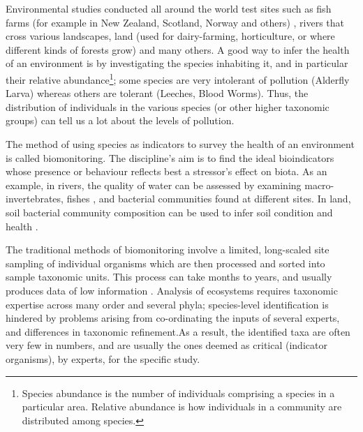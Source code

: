  

Environmental studies conducted all around the world test sites such as fish farms (for example in New Zealand, Scotland, Norway and others) \cite{stoeck_environmental_2018}, rivers that cross various landscapes, land (used for dairy-farming, horticulture, or where different kinds of forests grow)\cite{hermans_bacteria_2016} and many others. A good way to infer the health of an environment is by investigating the species inhabiting it, and in particular their relative abundance\footnote{Species abundance is the number of individuals comprising a species in a particular area. Relative abundance is how individuals in a community are distributed among species.}; some species are very intolerant of pollution (Alderfly Larva) whereas others are tolerant (Leeches, Blood Worms). Thus, the distribution of individuals in the various species (or other higher taxonomic groups) can tell us a lot about the levels of pollution. 

The method of using species as indicators to survey the health of an environment is called biomonitoring. The discipline's aim is to find the ideal bioindicators whose presence or behaviour reflects best a stressor's effect on biota. As an example, in rivers, the quality of water can be assessed by examining macro-invertebrates, fishes \cite{bioindicatorsinrivers}, and bacterial communities \cite{stoeck_environmental_2018} found at different sites. In land, soil bacterial community composition can be used to infer soil condition and health \cite{hermans_bacteria_2016}.

The traditional methods of biomonitoring involve a limited, long-scaled site sampling of individual organisms which are then processed and sorted into sample taxonomic units. This process can take months to years, and usually produces data of low information \cite{baird_biomonitoring_2012}. Analysis of ecosystems requires taxonomic expertise across many order and several phyla; species-level identification is hindered by problems arising from co-ordinating the inputs of several experts, and differences in taxonomic refinement.As a result, the identified taxa are often very few in numbers, and are usually the ones deemed as critical (indicator organisms), by experts, for the specific study\cite{cranston_biomonitoring_1990}. 

